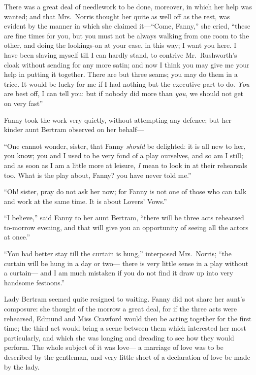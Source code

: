 \documentclass{article}
\begin{document}
There was a great deal of needlework to be done, moreover,
in which her help was wanted; and that Mrs.\ Norris
thought her quite as well off as the rest, was evident
by the manner in which she claimed it---``Come, Fanny,''
she cried, ``these are fine times for you, but you must
not be always walking from one room to the other,
and doing the lookings-on at your ease, in this way;
I want you here.  I have been slaving myself till I
can hardly stand, to contrive Mr.\ Rushworth's cloak
without sending for any more satin; and now I think
you may give me your help in putting it together.
There are but three seams; you may do them in a trice.
It would be lucky for me if I had nothing but the executive
part to do.  \emph{You} are best off, I can tell you:
but if nobody did more than \emph{you}, we should not get on
very fast''

Fanny took the work very quietly, without attempting
any defence; but her kinder aunt Bertram observed on her behalf---%

``One cannot wonder, sister, that Fanny \emph{should} be delighted:
it is all new to her, you know; you and I used to be
very fond of a play ourselves, and so am I still;
and as soon as I am a little more at leisure, \emph{I} mean
to look in at their rehearsals too.  What is the play about,
Fanny? you have never told me.''

``Oh! sister, pray do not ask her now; for Fanny is not
one of those who can talk and work at the same time.
It is about Lovers' Vows.''

``I believe,'' said Fanny to her aunt Bertram, ``there will
be three acts rehearsed to-morrow evening, and that will
give you an opportunity of seeing all the actors at once.''

``You had better stay till the curtain is hung,'' interposed
Mrs.\ Norris; ``the curtain will be hung in a day or two---%
there is very little sense in a play without a curtain---%
and I am much mistaken if you do not find it draw up
into very handsome festoons.''

Lady Bertram seemed quite resigned to waiting.  Fanny did
not share her aunt's composure:  she thought of the morrow
a great deal, for if the three acts were rehearsed,
Edmund and Miss Crawford would then be acting together
for the first time; the third act would bring a scene
between them which interested her most particularly,
and which she was longing and dreading to see how they
would perform.  The whole subject of it was love---%
a marriage of love was to be described by the gentleman,
and very little short of a declaration of love be made by
the lady.
\end{document}
